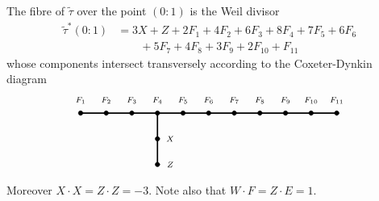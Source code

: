 \documentclass[12pt,reqno]{amsart}
\theoremstyle{definition}
\newcommand{\wt}{\widetilde}
\begin{document}
The fibre of $\wt \tau$ over the point $(0:1)$ is the Weil divisor
\begin{equation}\label{2024_07_22_13:35}
\begin{aligned}
    \wt \tau^*(0:1) &= 3X + Z + 2 F_1 + 4 F_2 + 6 F_3 + 8 F_4 + 7 F_5 + 6 F_6  \\
    &\qquad + 5 F_7 + 4 F_8 + 3 F_9 + 2 F_{10} + F_{11}
\end{aligned}
\end{equation}
whose components intersect transversely according to the Coxeter-Dynkin diagram
\[
\begin{tikzpicture}[line cap=round,line join=round,x=0.8cm,y=0.8cm]
\draw [line width=1.2pt] (-7.,0.)-- (3.,0.);
\draw [line width=1.2pt] (-4.,0.)-- (-4.,-2.);
\begin{scriptsize}
\draw [fill=black] (-7,0) circle (2pt);
\draw[color=black] (-7,0.5) node {$F_{1}$};    
\draw [fill=black] (-6,0) circle (2pt);
\draw[color=black] (-6,0.5) node {$F_{2}$};
\draw [fill=black] (-5,0) circle (2pt);
\draw[color=black] (-5,0.5) node {$F_3$};
\draw [fill=black] (-4,0) circle (2pt);
\draw[color=black] (-4,0.5) node {$F_4$};
\draw [fill=black] (-4,-1.) circle (2pt);
\draw[color=black] (-4.5 + 1,-1) node {$X$};
\draw [fill=black] (-4.,-2.) circle (2pt);
\draw[color=black] (-4.5 + 1,-2) node {$Z$};
\draw [fill=black] (-3,0) circle (2pt);
\draw[color=black] (-3,0.5) node {$F_5$};
\draw [fill=black] (-2.,0.) circle (2pt);
\draw[color=black] (-2.,.5) node {$F_6$};
\draw [fill=black] (-1.,0.) circle (2pt);
\draw[color=black] (-1.,.5) node {$F_7$};
\draw [fill=black] (0.,0.) circle (2pt);
\draw[color=black] (0.,.5) node {$F_8$};
\draw [fill=black] (1.,0.) circle (2pt);
\draw[color=black] (1.,0.5) node {$F_9$};
\draw [fill=black] (2.,0.) circle (2pt);
\draw[color=black] (2.,.5) node {$F_{10}$};
\draw [fill=black] (3.,0.) circle (2pt);
\draw[color=black] (3.,0.5) node {$F_{11}$};
\end{scriptsize}
\end{tikzpicture}
\]
Moreover $X\cdot X = Z \cdot Z = -3$.
Note also that $W \cdot F = Z \cdot E = 1$.
\end{document}
